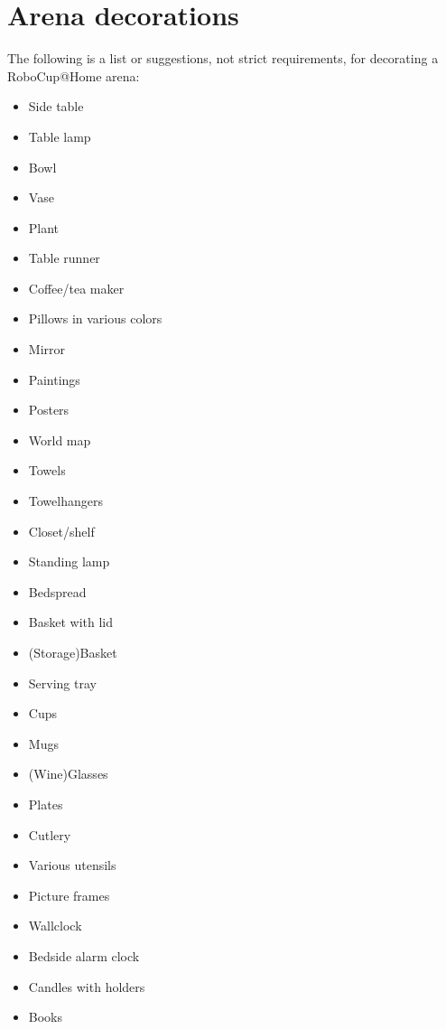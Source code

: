 \chapter{Arena decorations}
\label{chap:arena-decorations-appendix}
The following is a list or suggestions, not strict requirements, for decorating a RoboCup@Home arena:
\begin{itemize}
  \item Side table
  \item Table lamp
  \item Bowl
  \item Vase
  \item Plant
  \item Table runner
  \item Coffee/tea maker
  \item Pillows in various colors
  \item Mirror
  \item Paintings
  \item Posters
  \item World map
  \item Towels
  \item Towelhangers
  \item Closet/shelf
  \item Standing lamp
  \item Bedspread
  \item Basket with lid
  \item (Storage)Basket
  \item Serving tray
  \item Cups
  \item Mugs
  \item (Wine)Glasses
  \item Plates
  \item Cutlery
  \item Various utensils
  \item Picture frames
  \item Wallclock
  \item Bedside alarm clock
  \item Candles with holders
  \item Books
\end{itemize}
